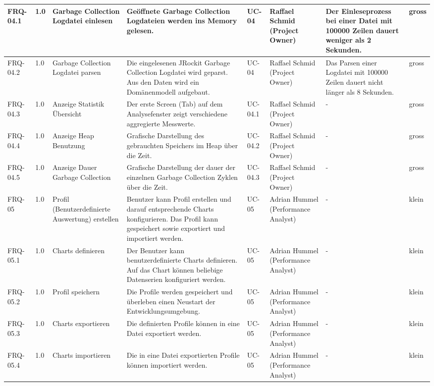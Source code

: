 \begin{landscape}
\begin{longtable}{|p{1.5cm}|p{0.7cm}|p{2.5cm}|p{3.9cm}|p{1.2cm}|p{2.5cm}|p{3.3cm}|p{0.8cm}|}
  FRQ-04.1 & 1.0 & Garbage Collection Logdatei einlesen & Geöffnete Garbage Collection Logdateien werden ins Memory gelesen.& UC-04 & Raffael Schmid (Project Owner) & Der Einleseprozess bei einer Datei mit 100000 Zeilen dauert weniger als 2 Sekunden. & gross  \\\hline

  FRQ-04.2 & 1.0 & Garbage Collection Logdatei parsen & Die eingelesenen JRockit Garbage Collection Logdatei wird geparst. Aus den Daten wird ein Domänenmodell aufgebaut. & UC-04 & Raffael Schmid (Project Owner)  & Das Parsen einer Logdatei mit 100000 Zeilen dauert nicht länger als 8 Sekunden. & gross  \\\hline


   FRQ-04.3 & 1.0 &  Anzeige Statistik Übersicht & Der erste Screen (Tab) auf dem Analysefenster zeigt verschiedene aggregierte Messwerte. & UC-04.1 &  Raffael Schmid (Project Owner) & - & gross \\\hline

   FRQ-04.4 & 1.0 & Anzeige Heap Benutzung  & Grafische Darstellung des gebrauchten Speichers im Heap über die Zeit. & UC-04.2 &Raffael Schmid (Project Owner) & - & gross \\\hline
   FRQ-04.5 & 1.0 & Anzeige Dauer Garbage Collection  & Grafische Darstellung der dauer der einzelnen Garbage Collection Zyklen über die Zeit. & UC-04.3 & Raffael Schmid (Project Owner) & - & gross \\\hline

   FRQ-05 & 1.0 & Profil (Benutzerdefinierte Auswertung) erstellen & Benutzer kann Profil erstellen und darauf entsprechende Charts konfigurieren. Das Profil kann gespeichert sowie exportiert und importiert werden.& UC-05 & Adrian Hummel (Performance Analyst) & - & klein \\\hline

FRQ-05.1 & 1.0 & Charts definieren & Der Benutzer kann benutzerdefinierte Charts definieren. Auf das Chart können beliebige Datenserien konfiguriert werden. & UC-05 & Adrian Hummel (Performance Analyst) & - & klein \\\hline

FRQ-05.2 & 1.0 & Profil speichern & Die Profile werden gespeichert und überleben einen Neustart der Entwicklungsumgebung. & UC-05 & Adrian Hummel (Performance Analyst) & - & klein \\\hline
FRQ-05.3 & 1.0 & Charts exportieren & Die definierten Profile können in eine Datei exportiert werden. & UC-05 & Adrian Hummel (Performance Analyst) & - & klein \\\hline
FRQ-05.4 & 1.0 & Charts importieren & Die in eine Datei exportierten Profile können importiert werden.& UC-05 & Adrian Hummel (Performance Analyst) & - & klein \\\hline



\end{longtable}
\end{landscape}
